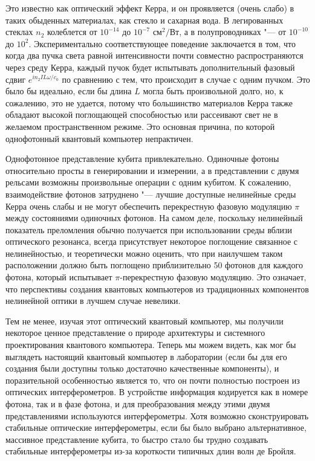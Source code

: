 \begin{multicols}{2}
{        Это известно как оптический эффект Керра, и он проявляется (очень слабо) в
        таких обыденных материалах, как стекло и сахарная вода. В легированных стеклах $n_2$ колеблется от $10^{-14}$ до $10^{-7}$ $\text{см}^2/\text{Вт}$,
        а в полупроводниках "--- от $10^{-10}$ до $10^2$.
        Экспериментально соответствующее поведение заключается в том, что
        когда два пучка света равной интенсивности почти совместно распространяются через
        среду Керра, каждый пучок будет испытывать дополнительный фазовый сдвиг $e^{in_2IL\omega / c_0}$ по сравнению с тем, что
        происходит в случае с одним пучком. Это было бы идеально, если бы длина $L$ могла быть произвольной
        долго, но, к сожалению, это не удается, потому что большинство материалов Керра также обладают высокой поглощающей
        способностью или рассеивают свет не в желаемом пространственном режиме. Это основная причина, по которой однофотонный квантовый компьютер непрактичен.

        Однофотонное представление кубита привлекательно. Одиночные фотоны относительно
        просты в генерировании и измерении, а в представлении с двумя рельсами возможны произвольные
        операции с одним кубитом. К сожалению, взаимодействие фотонов затруднено "--- лучшие доступные нелинейные среды Керра очень слабы и не могут обеспечить перекрестную фазовую модуляцию
        $\pi$ между состояниями одиночных фотонов. На самом деле, поскольку нелинейный показатель преломления обычно
        получается при использовании среды вблизи оптического резонанса, всегда присутствует некоторое поглощение
        связанное с нелинейностью, и теоретически можно оценить, что при наилучшем таком
        расположении должно быть поглощено приблизительно 50 фотонов для каждого фотона, который испытывает $\pi$-перекрестную фазовую модуляцию. Это означает, что перспективы создания квантовых
        компьютеров из традиционных компонентов нелинейной оптики в лучшем случае невелики.

        Тем не менее, изучая этот оптический квантовый компьютер, мы получили некоторое
        ценное представление о природе архитектуры и системного проектирования квантового
        компьютера. Теперь мы можем видеть, как мог бы выглядеть настоящий квантовый компьютер в
        лаборатории (если бы для его создания были доступны только достаточно качественные компоненты), и
        поразительной особенностью является то, что он почти полностью построен из оптических интерферометров.
        В устройстве информация кодируется как в номере фотона, так и в фазе
        фотона, и для преобразования между этими двумя представлениями используются интерферометры.
        Хотя возможно сконструировать стабильные оптические интерферометры, если бы было выбрано альтернативное, массивное
        представление кубита, то быстро стало бы трудно создавать
        стабильные интерферометры из-за короткости типичных длин волн де Бройля.

}
\end{multicols}
